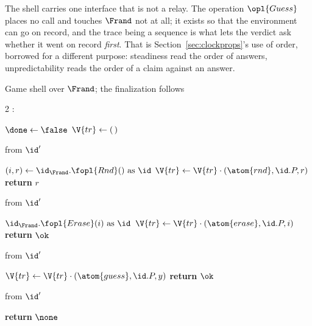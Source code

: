 \documentclass[10pt,oneside,openany]{book}
\theoremstyle{accentdef}
\theoremstyle{accentplain}
\begin{document}
The shell carries one interface that is not a relay. The operation $\opl{Guess}$ places no call and touches
$\Frand$ not at all; it exists so that the environment can go on record, and the trace being a
sequence is what lets the verdict ask whether it went on record \emph{first}. That is
Section~\ref{sec:clockprops}'s use of order, borrowed for a different purpose: steadiness read
the order of answers, unpredictability reads the order of a claim against an answer.

\begin{interface}[nofloat]{Game shell over $\Frand$; the finalization follows \\
}

{\scriptsize
\setlength{\columnsep}{1.4em}
\begin{multicols}{2}
:
\begin{algorithmic}[1]
\setcounter{contline}{0}\algcont
\State $\done \gets \false$
\State $\V{tr} \gets (\,)$
\algsave
\end{algorithmic}
\vspace{1.4ex}

 \quad from $\id'$
\begin{algorithmic}[1]
\algcont
\Req{$\neg\done$}
\State $(i,r) \gets \id_{\Frand}.\fopl{Rnd}() \text{ as } \id$ \label{ln:grnd}
\State $\V{tr} \gets \V{tr} \cdot (\atom{rnd},\id.P,r)$
\State \textbf{return} $r$
\algsave
\end{algorithmic}
\vspace{1.4ex}

 \quad from $\id'$
\begin{algorithmic}[1]
\algcont
\Req{$\neg\done$}
\State $\id_{\Frand}.\fopl{Erase}(i) \text{ as } \id$
\State $\V{tr} \gets \V{tr} \cdot (\atom{erase},\id.P,i)$
\State \textbf{return} $\ok$
\algsave
\end{algorithmic}
\vspace{1.4ex}

\columnbreak

 \quad from $\id'$
\begin{algorithmic}[1]
\algcont
\Req{$\neg\done$}
\State $\V{tr} \gets \V{tr} \cdot (\atom{guess},\id.P,y)$ \label{ln:gguess}
\State \textbf{return} $\ok$
\algsave
\end{algorithmic}
\vspace{1.4ex}

 \quad from $\id'$
\begin{algorithmic}[1]
\algcont
\State \textbf{return} $\none$
\algsave
\end{algorithmic}
\end{multicols}}
\end{interface}
\end{document}

